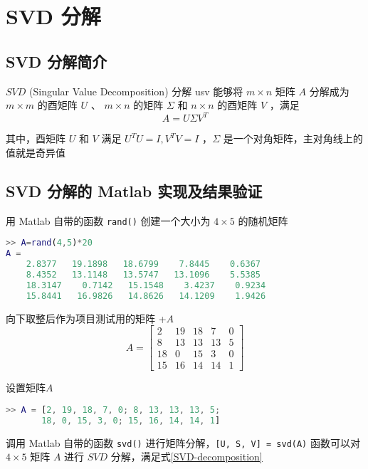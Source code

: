 \chapter{SVD 分解}
\section{SVD 分解简介}
$SVD$ (Singular Value Decomposition) 分解
usv
能够将 $m\times n$ 矩阵 $A$ 
分解成为 
$m\times m$ 的酉矩阵 $U$ 、 
$m\times n$ 的矩阵 $\Sigma$ 和 
$n\times n$ 的酉矩阵 $V$ ，满足
\begin{equation}
    A=U\Sigma V^T
    \label{SVD-decomposition}
\end{equation}

其中，酉矩阵 $U$ 和 $V$ 满足 $U^TU=I, V^TV=I$ ，$\Sigma$ 是一个对角矩阵，主对角线上的值就是奇异值


\section{SVD 分解的 Matlab 实现及结果验证}

用 Matlab 自带的函数 \lstinline|rand()| 创建一个大小为 $4\times 5$ 的随机矩阵

\begin{lstlisting}[language=Matlab]  
>> A=rand(4,5)*20
A =
    2.8377   19.1898   18.6799    7.8445    0.6367
    8.4352   13.1148   13.5747   13.1096    5.5385
    18.3147    0.7142   15.1548    3.4237    0.9234
    15.8441   16.9826   14.8626   14.1209    1.9426
\end{lstlisting}

向下取整后作为项目测试用的矩阵 +$A$
\begin{equation}
    A=\begin{bmatrix}
         2 & 19 & 18 &  7 &  0 \\
         8 & 13 & 13 & 13 &  5 \\
        18 &  0 & 15 &  3 &  0 \\
        15 & 16 & 14 & 14 &  1
    \end{bmatrix}
\end{equation}


设置矩阵$A$
\begin{lstlisting}[language=Matlab]  
>> A = [2, 19, 18, 7, 0; 8, 13, 13, 13, 5;
       18, 0, 15, 3, 0; 15, 16, 14, 14, 1]
\end{lstlisting}

调用 Matlab 自带的函数 \lstinline|svd()| 进行矩阵分解，\lstinline|[U, S, V] = svd(A)| 函数可以对 $4\times 5$ 矩阵 $A$ 进行 $SVD$ 分解，满足式\ref{SVD-decomposition}

